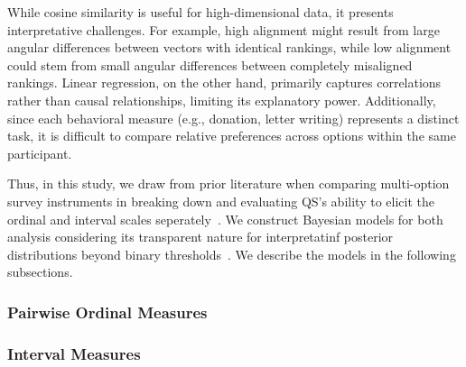 While cosine similarity is useful for high-dimensional data, it presents interpretative challenges. For example, high alignment might result from large angular differences between vectors with identical rankings, while low alignment could stem from small angular differences between completely misaligned rankings. Linear regression, on the other hand, primarily captures correlations rather than causal relationships, limiting its explanatory power. Additionally, since each behavioral measure (e.g., donation, letter writing) represents a distinct task, it is difficult to compare relative preferences across options within the same participant.

Thus, in this study, we draw from prior literature when comparing multi-option survey instruments in breaking down and evaluating QS's ability to elicit the ordinal and interval scales seperately~\cite{collewetPreferenceEstimationPoint2023}. We construct Bayesian models for both analysis considering its transparent nature for interpretatinf posterior distributions beyond binary thresholds~\cite{mcelreath2018statistical, kay2016researcher}. We describe the models in the following subsections.

\subsubsection{Pairwise Ordinal Measures}
\label{sec:ordinal_measures}


\subsubsection{Interval Measures}
\label{sec:interval_measures}

